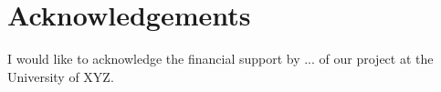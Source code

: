 \section*{Acknowledgements}
I would like to acknowledge the financial support by ... of our project at the University of XYZ.